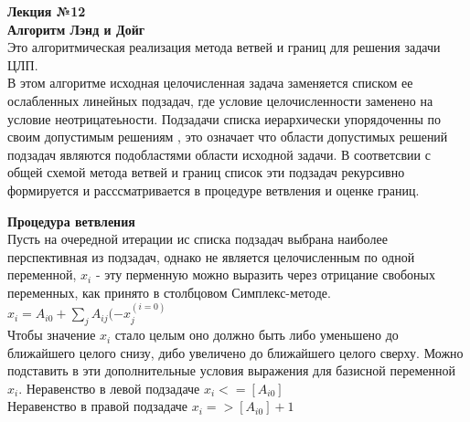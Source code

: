 

\LARGE{ \textbf {Лекция №12}}\\
\Large{ \textbf {Алгоритм Лэнд и Дойг}}\\
Это алгоритмическая реализация метода ветвей и границ для решения задачи ЦЛП.\\
В этом алгоритме исходная целочисленная задача заменяется списком ее ослабленных линейных подзадач,
где условие целочисленности заменено на условие неотрицатеьности.
Подзадачи списка иерархически упорядоченны по своим допустимым решениям ,
это означает что области допустимых решений  подзадач являются подобластями области исходной задачи.
В соответсвии с общей схемой метода ветвей и границ список эти подзадач рекурсивно формируется  и расссматривается
в процедуре ветвления и оценке границ.

\textbf{Процедура ветвления }\\
Пусть на очередной итерации ис списка подзадач выбрана наиболее перспективная из подзадач,
однако не является целочисленным по одной переменной, $x_i$ - эту перменную можно выразить через отрицание свобоных переменных,
как принято в столбцовом Симплекс-методе.
$x_i = A_{i0} + \sum \limits_j A_{ij}(-x_j^(i=0)$\\

Чтобы значение $x_i$ стало целым оно должно быть либо уменьшено до ближайшего целого снизу, дибо увеличено до ближайшего целого сверху.
Можно подставить в эти дополнительные условия выражения для базисной переменной $x_i$.
Неравенство в левой подзадаче $x_i <= [A_{i0}]$\\
Неравенство в правой подзадаче $x_i => [A_{i0}] + 1$\\

